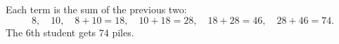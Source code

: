 Each term is the sum of the previous two:
\[8,\quad10,\quad8+10=18,\quad10+18=28,\quad18+28=46,\quad28+46=74.\]
The $6$th student gets $\boxed{74}$ piles.
